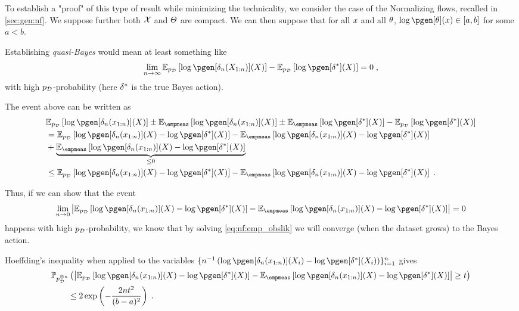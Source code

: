 To establish a "proof" of this type of result while minimizing the technicality, we consider the case of the Normalizing flows, recalled in \cref{sec:gen:nf}.
We suppose further both $\mathcal{X}$ and $\varTheta$ are compact. We can then suppose that for all $x$ and all $\theta$, $\log \pgen[\param](\lstate)  \in [a, b]$ for some $a < b$.

Establishing \textit{quasi-Bayes} would mean at least something like
\begin{equation}
    \lim_{\ndata \rightarrow \infty} \PE{\pdata}{\log \pgen[\decfun_n(\chunk{\state}{1}{n})](\state)}- \PE{\pdata}{\log \pgen[\tmin{\decfun}](\state)} = 0 \eqsp,
\end{equation}
with high $p_{\mathcal{D}}$-probability (here ${\delta}^{*}$ is the true Bayes action).

The event above can be written as
\begin{align*}
    &\PE{\pdata}{\log \pgen[\decfun_n(\chunk{\lstate}{1}{n})](\state)} \pm \PE{\empmeas}{\log \pgen[\decfun_n(\chunk{\lstate}{1}{n})](\state)} \pm \PE{\empmeas}{\log \pgen[\tmin{\decfun}](\state)} - \PE{\pdata}{\log \pgen[\tmin{\decfun}](\state)} \\
    & = \PE{\pdata}{\log \pgen[\decfun_n(\chunk{\lstate}{1}{n})](\state) - \log \pgen[\tmin{\decfun}](\state)} - \PE{\empmeas}{\log \pgen[\decfun_n(\chunk{\lstate}{1}{n})](\state) - \log \pgen[\tmin{\decfun}](\state)}  \\
    &+ \underbrace{\PE{\empmeas}{\log \pgen[\decfun_n(\chunk{\lstate}{1}{n})](\state) - \log \pgen[\tmin{\decfun}](\state)}}_{\leq 0} \\
    & \leq \PE{\pdata}{\log \pgen[\decfun_n(\chunk{\lstate}{1}{n})](\state) - \log \pgen[\tmin{\decfun}](\state)} - \PE{\empmeas}{\log \pgen[\decfun_n(\chunk{\lstate}{1}{n})](\state) - \log \pgen[\tmin{\decfun}](\state)} \eqsp.
\end{align*}

Thus, if we can show that the event
\begin{equation*}
    \lim_{\ndata \rightarrow 0} \left|\PE{\pdata}{\log \pgen[\decfun_n(\chunk{\lstate}{1}{n})](\state) - \log \pgen[\tmin{\decfun}](\state)} - \PE{\empmeas}{\log \pgen[\decfun_n(\chunk{\lstate}{1}{n})](\state) - \log \pgen[\tmin{\decfun}](\state)}\right| = 0
\end{equation*}
happens with high $p_{\mathcal{D}}$-probability, we know that by solving \eqref{eq:nf:emp_obslik} we will converge (when the dataset grows) to the Bayes action.

Hoeffding's inequality when applied to the variables $\{n^{-1}\left(\log\pgen[\decfun_n(\chunk{\lstate}{1}{n})](\state_i) - \log \pgen[\tmin{\decfun}](\state_i)\right)\}_{i=1}^{n}$ gives
\begin{align*}
    &\PP_{\pdata^{\tensprod n}}\left(\left|\PE{\pdata}{\log \pgen[\decfun_n(\chunk{\lstate}{1}{n})](\state) - \log \pgen[\tmin{\decfun}](\state)} - \PE{\empmeas}{\log \pgen[\decfun_n(\chunk{\lstate}{1}{n})](\state) - \log \pgen[\tmin{\decfun}](\state)}\right| \geq t\right) \\
    & \qquad \leq 2 \exp\left(-\frac{2 n t^2}{(b-a)^2}\right) \eqsp.    
\end{align*}

